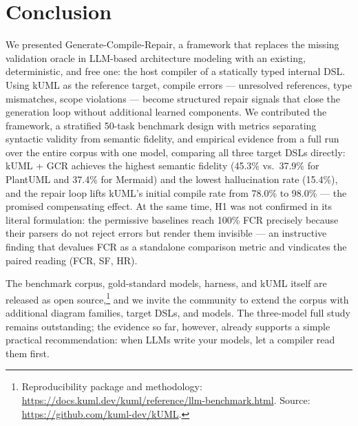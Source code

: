 \documentclass[acmsmall,nonacm]{acmart}
\begin{document}
\section{Conclusion}
\label{sec:conclusion}

We presented Generate-Compile-Repair, a framework that replaces the missing validation oracle in LLM-based architecture modeling with an existing, deterministic, and free one: the host compiler of a statically typed internal DSL. Using kUML as the reference target, compile errors --- unresolved references, type mismatches, scope violations --- become structured repair signals that close the generation loop without additional learned components. We contributed the framework, a stratified 50-task benchmark design with metrics separating syntactic validity from semantic fidelity, and empirical evidence from a full run over the entire corpus with one model, comparing all three target DSLs directly: kUML + GCR achieves the highest semantic fidelity (45.3\% vs.\ 37.9\% for PlantUML and 37.4\% for Mermaid) and the lowest hallucination rate (15.4\%), and the repair loop lifts kUML's initial compile rate from 78.0\% to 98.0\% --- the promised compensating effect. At the same time, H1 was not confirmed in its literal formulation: the permissive baselines reach 100\% FCR precisely because their parsers do not reject errors but render them invisible --- an instructive finding that devalues FCR as a standalone comparison metric and vindicates the paired reading (FCR, SF, HR).

The benchmark corpus, gold-standard models, harness, and kUML itself are released as open source,\footnote{Reproducibility package and methodology: \url{https://docs.kuml.dev/kuml/reference/llm-benchmark.html}. Source: \url{https://github.com/kuml-dev/kUML}.} and we invite the community to extend the corpus with additional diagram families, target DSLs, and models. The three-model full study remains outstanding; the evidence so far, however, already supports a simple practical recommendation: when LLMs write your models, let a compiler read them first.



\end{document}
